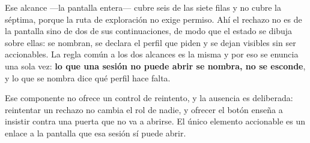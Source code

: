 Ese alcance ---la pantalla entera--- cubre seis de las siete filas y no cubre la séptima, porque la
ruta de exploración no exige permiso. Ahí el rechazo no es de la pantalla sino de dos de sus
continuaciones, de modo que el estado se dibuja sobre ellas: se nombran, se declara el perfil que
piden y se dejan visibles sin ser accionables. La regla común a los dos alcances es la misma y por
eso se enuncia una sola vez: \textbf{lo que una sesión no puede abrir se nombra, no se esconde}, y
lo que se nombra dice qué perfil hace falta.

Ese componente no ofrece un control de reintento, y la ausencia es deliberada: reintentar un rechazo
no cambia el rol de nadie, y ofrecer el botón enseña a insistir contra una puerta que no va a
abrirse. El único elemento accionable es un enlace a la pantalla que esa sesión sí puede abrir.
